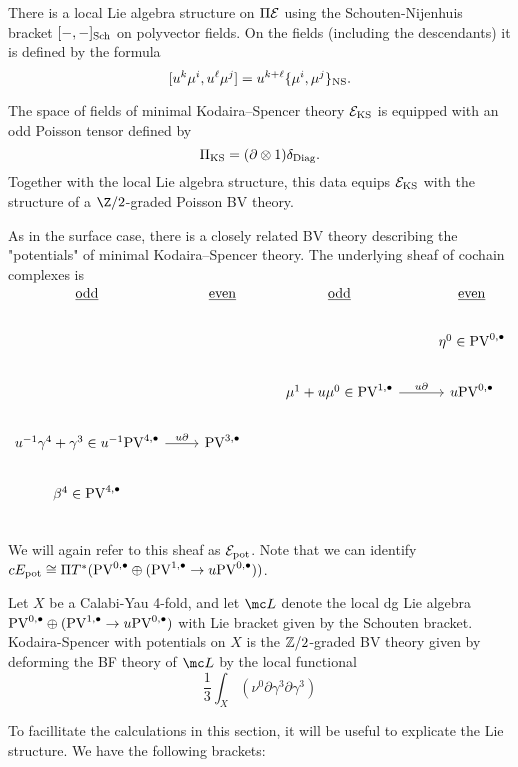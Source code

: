 \documentclass[11pt]{amsart}
\def\PV{{\rm PV}}
\begin{document}
There is a local Lie algebra structure on $\Pi\mathcal E$ using the Schouten-Nijenhuis bracket $[-,-]_{\rm Sch}$ on polyvector fields.
On the fields (including the descendants) it is defined by the formula
\[
[u^k \mu^i , u^\ell \mu^j] = u^{k+\ell} \{\mu^i, \mu^j\}_{\rm NS} .
\]

The space of fields of minimal Kodaira--Spencer theory $\mathcal E_{\rm KS}$ is equipped with an odd Poisson tensor defined by
\[
\Pi_{\rm KS} = (\partial \otimes 1) \delta_{\rm Diag} .
\]
Together with the local Lie algebra structure, this data equips $\mathcal E_{\rm KS}$ with the structure of a $\Z/2$-graded Poisson BV theory.

As in the surface case, there is a closely related BV theory describing the "potentials" of minimal Kodaira--Spencer theory.
The underlying sheaf of cochain complexes is
\[
\begin{tikzcd}
\ul{\rm odd} & \ul{\rm even} & \ul{\rm odd} & \ul{\rm even} \\
& & & \eta^{0}\in\PV^{0,\bu} \\
& & \mu^{1}+u\mu^{0}\in\PV^{1,\bu} \ar[r, "u \partial"] & u \PV^{0,\bu} \\
u^{-1} \gamma^4 + \gamma^3  \in u^{-1} \PV^{4,\bu} \ar[r, "u \partial"] & \PV^{3,\bu} & &  \\
\beta^{4} \in\PV^{4,\bu} &  &  & \\
\end{tikzcd}
\]
We will again refer to this sheaf as $\mathcal E_{\rm pot}$. Note that we can identify $cE_{\rm pot}\cong \Pi T^{*}(\PV^{0,\bu}\oplus (\PV^{1,\bu}\to u\PV^{0,\bu}))$.

\begin{dfn}
  Let $X$ be a Calabi-Yau 4-fold, and let $\mc L$ denote the local dg Lie algebra $\PV^{0,\bu}\oplus (\PV^{1,\bu}\to u\PV^{0,\bu})$ with Lie bracket given by the Schouten bracket. Kodaira-Spencer with potentials on $X$ is the $\mathbb Z/2$-graded BV theory given by deforming the BF theory of $\mc L$ by the local functional \[ \frac{1}{3}\int_{X}(\nu^{0}\partial\gamma^{3}\partial\gamma^{3})\]\end{dfn}

To facillitate the calculations in this section, it will be useful to explicate the Lie structure. We have the following brackets:
\end{document}
